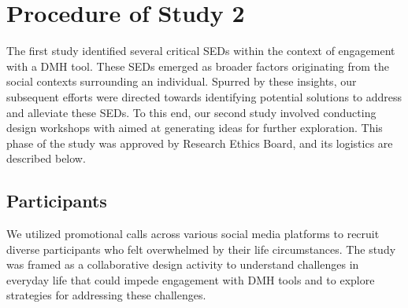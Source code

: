 \section{Procedure of Study 2}

The first study identified several critical SEDs within the context of engagement with a DMH tool. These SEDs emerged as broader factors originating from the social contexts surrounding an individual. Spurred by these insights, our subsequent efforts were directed towards identifying potential solutions to address and alleviate these SEDs. To this end, our second study involved conducting design workshops with  aimed at generating ideas for further exploration. 
This phase of the study was approved by  Research Ethics Board, and its logistics are described below. 

\subsection{Participants}

We utilized promotional calls across various social media platforms to recruit diverse participants who felt overwhelmed by their life circumstances. %
The study was framed as a collaborative design activity to understand challenges in everyday life that could impede engagement with DMH tools and to explore strategies for addressing these challenges. 


